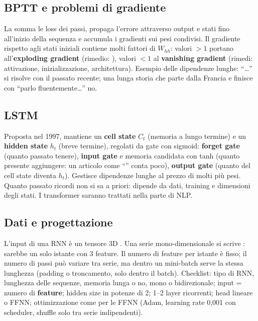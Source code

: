 \subsection{BPTT e problemi di gradiente}
La  somma le loss dei passi, propaga l'errore attraverso output e
stati fino all'inizio della sequenza e accumula i gradienti sui pesi condivisi. Il gradiente rispetto
agli stati iniziali contiene molti fattori di $W_{hh}$: valori $>1$ portano all'\textbf{exploding
gradient} (rimedio: ), valori $<1$ al \textbf{vanishing gradient} (rimedi:
attivazione, inizializzazione, architettura). Esempio delle dipendenze lunghe: ``\ldots'' si risolve con il passato recente; una lunga storia che parte dalla Francia e finisce con
``parlo fluentemente\ldots'' no.

\subsection{LSTM}
Proposta nel 1997, mantiene un \textbf{cell state} $C_t$ (memoria a lungo termine) e un
\textbf{hidden state} $h_t$ (breve termine), regolati da gate con sigmoid: \textbf{forget gate}
(quanto passato tenere), \textbf{input gate} e memoria candidata con tanh (quanto presente
aggiungere: un articolo come ``'' conta poco), \textbf{output gate} (quanto del cell state
diventa $h_t$). Gestisce dipendenze lunghe al prezzo di molti più pesi. Quanto passato ricordi non si
sa a priori: dipende da dati, training e dimensioni degli stati. I transformer saranno trattati nella
parte di NLP.

\subsection{Dati e progettazione}
L'input di una RNN è un tensore 3D . Una serie mono-dimensionale si
scrive \code{[[1],[2],[3]]}: \code{[1,2,3]} sarebbe un solo istante con 3 feature. Il numero di
feature per istante è fisso; il numero di passi può variare tra serie, ma dentro un mini-batch serve
la stessa lunghezza (padding o troncamento, solo dentro il batch). Checklist: tipo di RNN, lunghezza
delle sequenze, memoria lunga o no, mono o bidirezionale; input = numero di \textbf{feature}; hidden
size in potenze di 2; 1--2 layer ricorrenti; head lineare o FFNN; ottimizzazione come per le FFNN
(Adam, learning rate 0,001 con scheduler, shuffle solo tra serie indipendenti).


